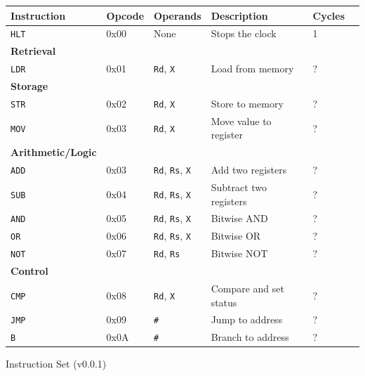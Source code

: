 \documentclass[a4paper,11pt]{article}
\makeatletter
\newenvironment{tablehere}
  {\def\@captype{table}}
  {}
\makeatother
\begin{document}
\begin{tablehere}
  \centering
  \begin{tabular}{@{}llllll@{}}
    \toprule
    \textbf{Instruction}      & \textbf{Opcode} & \textbf{Operands}                    & \textbf{Description}   & \textbf{Cycles} \\
    \midrule
    \texttt{HLT}              & 0x00            & None                                 & Stops the clock        & 1               \\
    \midrule
    \textbf{Retrieval}        &                 &                                      &                        &                 \\
    \texttt{LDR}              & 0x01            & \texttt{Rd}, \texttt{X}              & Load from memory       & ?               \\
    \textbf{Storage}          &                 &                                      &                        &                 \\
    \texttt{STR}              & 0x02            & \texttt{Rd}, \texttt{X}              & Store to memory        & ?               \\
    \texttt{MOV}              & 0x03            & \texttt{Rd}, \texttt{X}              & Move value to register & ?               \\
    \midrule
    \textbf{Arithmetic/Logic} &                 &                                      &                        &                 \\
    \texttt{ADD}              & 0x03            & \texttt{Rd}, \texttt{Rs}, \texttt{X} & Add two registers      & ?               \\
    \texttt{SUB}              & 0x04            & \texttt{Rd}, \texttt{Rs}, \texttt{X} & Subtract two registers & ?               \\
    \texttt{AND}              & 0x05            & \texttt{Rd}, \texttt{Rs}, \texttt{X} & Bitwise AND            & ?               \\
    \texttt{OR}               & 0x06            & \texttt{Rd}, \texttt{Rs}, \texttt{X} & Bitwise OR             & ?               \\
    \texttt{NOT}              & 0x07            & \texttt{Rd}, \texttt{Rs}             & Bitwise NOT            & ?               \\
    \midrule
    \textbf{Control}          &                 &                                      &                        &                 \\
    \texttt{CMP}              & 0x08            & \texttt{Rd}, \texttt{X}              & Compare and set status & ?               \\
    \texttt{JMP}              & 0x09            & \texttt{\#}                          & Jump to address        & ?               \\
    \texttt{B}                & 0x0A            & \texttt{\#}                          & Branch to address      & ?               \\
    \bottomrule
  \end{tabular}
  \caption{Instruction Set (v0.0.1)}
  \label{tab:Instruction Set}
\end{tablehere}
\end{document}
